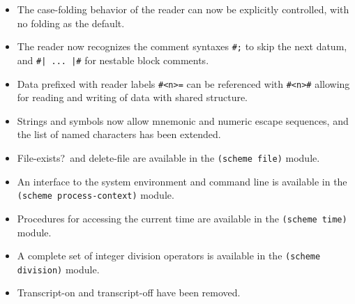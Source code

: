 \begin{itemize}
\item The case-folding behavior of the reader can now be explicitly
controlled, with no folding as the default.

\item The reader now recognizes the comment syntaxes {\tt \#;} to
skip the next datum, and {\tt \#| ... |\#}
for nestable block comments.

\item Data prefixed with reader labels {\tt \#<n>=} can be referenced
with {\tt \#<n>\#} allowing for reading and writing of data with
shared structure.

\item Strings and symbols now allow mnemonic and numeric escape
sequences, and the list of named characters has been extended.

\item {\cf File-exists?}\ and {\cf delete-file} are available in the
{\tt (scheme file)} module.

\item An interface to the system environment and command line is
available in the {\tt (scheme process-context)} module.

\item Procedures for accessing the current time are available in the
{\tt (scheme time)} module.

\item A complete set of integer division operators is available in the
{\tt (scheme division)} module.

\item {\cf Transcript-on} and {\cf transcript-off} have been removed.

\end{itemize}

